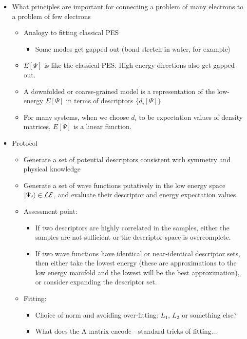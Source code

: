 \documentclass[prl,12pt,onecolumn,nofootinbib,notitlepage,english,superscriptaddress]{revtex4-1}
\begin{document}
 
\begin{itemize}
\item What principles are important for connecting a problem of many electrons to a problem of few electrons
 \begin{itemize}
\item Analogy to fitting classical PES
    \begin{itemize}
    \item Some modes get gapped out (bond stretch in water, for example)
    \end{itemize}
\item $E[\Psi]$ is like the classical PES. High energy directions also get gapped out. 
\item A downfolded or coarse-grained model is a representation of the low-energy $E[\Psi]$ in terms of descriptors $\{d_i[\Psi]\}$
\item For many systems, when we choose $d_i$ to be expectation values of density matrices, $E[\Psi]$ is a linear function.
\end{itemize}


	
\item Protocol 
   \begin{itemize}
   \item Generate a set of potential descriptors consistent with symmetry and physical knowledge
   \item Generate a set of wave functions putatively in the low energy space $|\Psi_i\rangle \in {\cal LE} $, and evaluate their descriptor and energy expectation values.
   \item Assessment point: 
      \begin{itemize}
      \item If two descriptors are highly correlated in the samples, either the samples are not sufficient or the descriptor space is overcomplete.
      \item If two wave functions have identical or near-identical descriptor sets, then either take the lowest energy (these are approximations to the low energy manifold and the lowest will be the best approximation), or consider expanding the descriptor set.
      \end{itemize}
   \item Fitting: 
      	\begin{itemize}
      	\item Choice of norm and avoiding over-fitting: $L_1$, $L_2$ or something else? 
      	\item What does the A matrix encode - standard tricks of fitting...
	\end{itemize}


\end{itemize}
\end{itemize}
\end{document}
